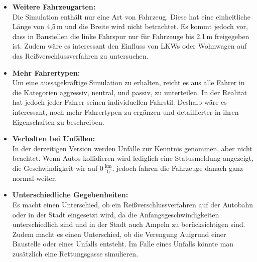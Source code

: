 \begin{itemize}
\item \textbf{Weitere Fahrzeugarten:}\\
Die Simulation enthält nur eine Art von Fahrzeug. Diese hat eine einheitliche Länge von 4,5\,m und die Breite wird nicht betrachtet. Es kommt jedoch vor, dass in Baustellen die linke Fahrspur nur für Fahrzeuge bis 2,1\,m freigegeben ist.
Zudem wäre es interessant den Einfluss von LKWs oder Wohnwagen auf das Reißverschlussverfahren zu untersuchen.

\item \textbf{Mehr Fahrertypen:}\\
Um eine aussagekräftige Simulation zu erhalten, reicht es aus alle Fahrer in die Kategorien aggressiv, neutral, und passiv, zu unterteilen. In der Realität hat jedoch jeder Fahrer seinen individuellen Fahrstil. Deshalb wäre es interessant, noch mehr Fahrertypen zu ergänzen und detaillierter in ihren Eigenschaften zu beschreiben.

\item \textbf{Verhalten bei Unfällen:}\\
In der derzeitigen Version werden Unfälle zur Kenntnis genommen, aber nicht beachtet. Wenn Autos kollidieren wird lediglich eine Statusmeldung angezeigt, die Geschwindigkeit wir auf 0\,$ \frac{\text{km}}{\text{h}} $, jedoch fahren die Fahrzeuge danach ganz normal weiter.

\item \textbf{Unterschiedliche Gegebenheiten:}\\
Es macht einen Unterschied, ob ein Reißverschlussverfahren auf der Autobahn oder in der Stadt eingesetzt wird, da die Anfangsgeschwindigkeiten unterschiedlich sind und in der Stadt auch Ampeln zu berücksichtigen sind.\\
Zudem macht es einen Unterschied, ob die Verengung Aufgrund einer Baustelle oder eines Unfalls entsteht. Im Falle eines Unfalls könnte man zusätzlich eine Rettungsgasse simulieren.
\end{itemize}
